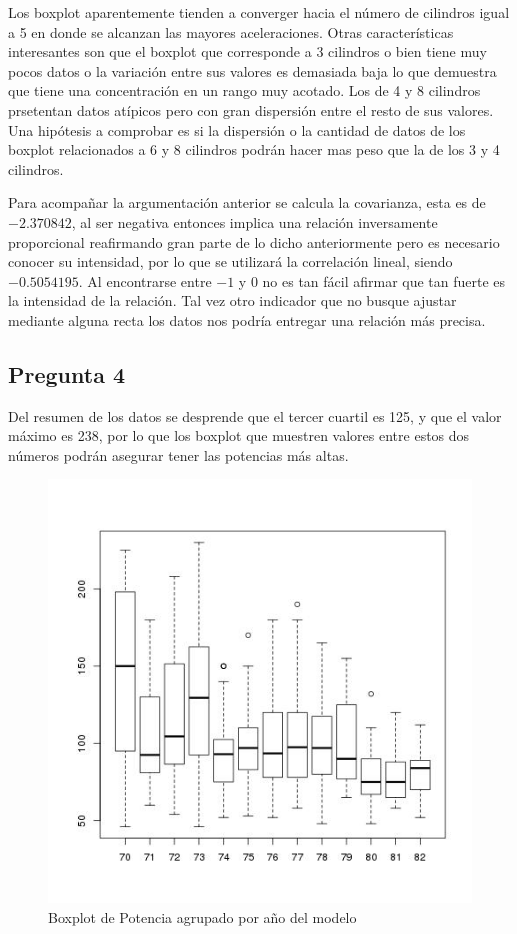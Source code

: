 \documentclass[letter,10pt]{article}
\begin{document}
Los boxplot aparentemente tienden a converger hacia el número de cilindros igual a 5 en donde se alcanzan las mayores aceleraciones. Otras características
interesantes son que el boxplot que corresponde a 3 cilindros o  bien tiene muy pocos datos o la variación entre sus valores es demasiada baja lo que demuestra
que tiene una concentración en un rango muy acotado. Los de 4 y 8 cilindros prsetentan datos atípicos pero con gran dispersión entre el resto de sus valores.
Una hipótesis a comprobar es si la dispersión o la cantidad de datos de los boxplot relacionados a 6 y 8 cilindros podrán hacer mas peso que la de los 3 y 4 cilindros.


 Para acompañar la argumentación anterior se calcula la covarianza, esta es de $-2.370842$, al ser negativa entonces
 implica una relación inversamente proporcional 
 reafirmando gran parte de lo dicho anteriormente pero es necesario conocer su intensidad, por lo que se utilizará 
 la correlación lineal, siendo $-0.5054195$. Al encontrarse entre $-1$ y $0$ no es tan fácil afirmar que
 tan fuerte es la intensidad de la relación. Tal vez otro indicador que no busque ajustar mediante alguna recta los datos nos
 podría entregar una relación más precisa.
 


\newpage

\subsection{Pregunta 4}
Del resumen de los datos se desprende que el tercer cuartil es 125, y que el valor máximo es 238, por lo que
los boxplot que muestren valores entre estos dos números podrán asegurar tener las potencias más altas.
\begin{figure}[h!]
    \centering
    \includegraphics[scale=0.5]{boxplot_horsepower_model_year.jpg}
    \caption{Boxplot de Potencia agrupado por año del modelo}
    \label{fig:boxplot_horsepower_model_year}
\end{figure}
\end{document}
